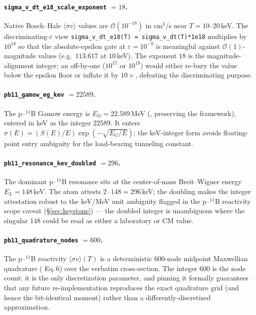 \paragraph{\texttt{sigma\_v\_dt\_e18\_scale\_exponent} $= 18$.}
Native Bosch--Hale $\langle\sigma v\rangle$ values are $\mathcal{O}(10^{-18})$
in cm$^3$/s near $T=10$--$20$\,keV. The discriminating-$\varepsilon$ view
\verb|sigma_v_dt_e18(T) = sigma_v_dt(T)*1e18| multiplies by $10^{18}$ so that
the absolute-epsilon gate at $\varepsilon=10^{-9}$ is meaningful against
$\mathcal{O}(1)$-magnitude values (e.g.\ $113.617$ at $10$\,keV). The exponent
$18$ is the magnitude-alignment integer; an off-by-one ($10^{17}$ or
$10^{19}$) would either re-bury the value below the epsilon floor or inflate it
by $10\times$, defeating the discriminating purpose.

\paragraph{\texttt{pb11\_gamow\_eg\_kev} $= 22589$.}
The p--$^{11}$B Gamow energy is $E_G = 22.589$\,MeV
(\citep{tentori2023pb11}, preserving the \citep{nevinsswain2000} framework),
entered in keV as the integer $22589$. It enters $\sigma(E) =
(S(E)/E)\exp(-\sqrt{E_G/E})$; the keV-integer form avoids floating-point entry
ambiguity for the load-bearing tunneling constant.

\paragraph{\texttt{pb11\_resonance\_kev\_doubled} $= 296$.}
The dominant p--$^{11}$B resonance sits at the center-of-mass Breit--Wigner
energy $E_L = 148$\,keV. The atom attests $2\cdot148 = 296$\,keV; the doubling
makes the integer attestation robust to the keV/MeV unit ambiguity flagged in
the p--$^{11}$B reactivity scope caveat (\S\ref{sec:keystone}) --- the doubled
integer is unambiguous where the singular $148$ could be read as either a
laboratory or CM value.

\paragraph{\texttt{pb11\_quadrature\_nodes} $= 600$.}
The p--$^{11}$B reactivity $\langle\sigma v\rangle(T)$ is a deterministic
$600$-node midpoint Maxwellian quadrature (\citep{tentori2023pb11} Eq.\,6) over
the verbatim cross-section. The integer $600$ is the node count; it is the only
discretization parameter, and pinning it formally guarantees that any future
re-implementation reproduces the exact quadrature grid (and hence the
bit-identical moment) rather than a differently-discretized approximation.

